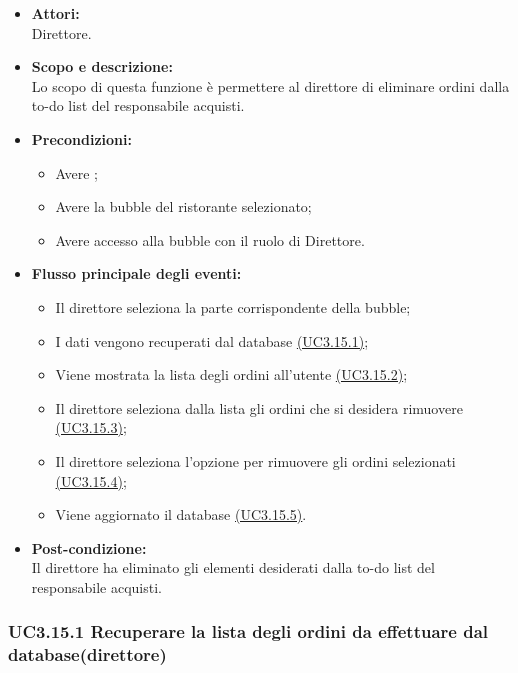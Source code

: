 \begin{itemize}
	\item \textbf{Attori:}
	\\Direttore.
	\item \textbf{Scopo e descrizione:} 
	\\Lo scopo di questa funzione è permettere al direttore di eliminare ordini dalla to-do list del responsabile acquisti.
	\item \textbf{Precondizioni:}
	\begin{itemize}
		\item Avere ;
		\item Avere la bubble del ristorante selezionato;
		\item Avere accesso alla bubble con il ruolo di Direttore.
	\end{itemize}
	\item \textbf{Flusso principale degli eventi:}
	\begin{itemize}
		\item Il direttore seleziona la parte corrispondente della bubble;
		\item I dati vengono recuperati dal database \hyperref[UC3.15.1]{(UC3.15.1)};
		\item Viene mostrata la lista degli ordini all’utente \hyperref[UC3.15.2]{(UC3.15.2)};
		\item Il direttore seleziona dalla lista gli ordini che si desidera rimuovere \hyperref[UC3.15.3]{(UC3.15.3)};
		\item Il direttore seleziona l’opzione per rimuovere gli ordini selezionati \hyperref[UC3.15.4]{(UC3.15.4)};
		\item Viene aggiornato il database \hyperref[UC3.15.5]{(UC3.15.5)}.
	\end{itemize}
	\item \textbf{Post-condizione:}
	\\Il direttore ha eliminato gli elementi desiderati dalla to-do list del responsabile acquisti.
\end{itemize}

\subsubsection{UC3.15.1 Recuperare la lista degli ordini da effettuare dal database(direttore)} \label{UC3.15.1}

